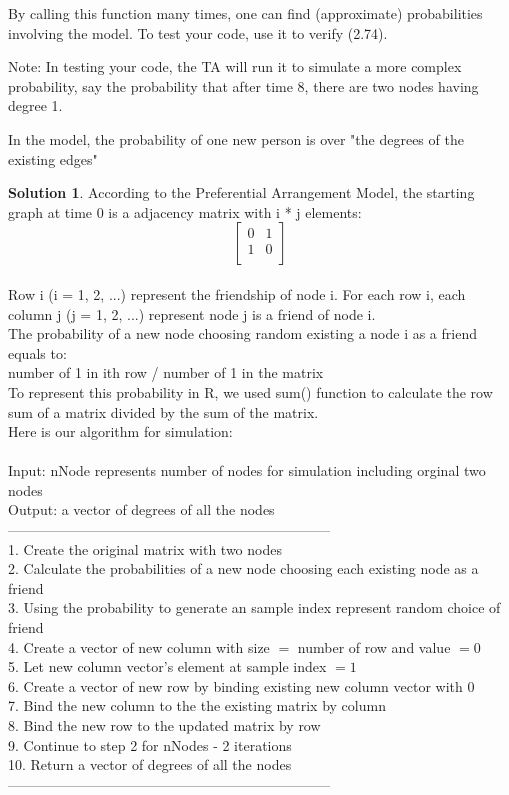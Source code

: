 \documentclass[paper=a4, fontsize=11pt]{scrartcl} %
\numberwithin{equation}{section} %
\numberwithin{figure}{section} %
\numberwithin{table}{section} %
\theoremstyle{definition}
\newtheorem*{solution}{Solution}
\begin{document}
By calling this function many times, one can find (approximate) probabilities involving the model. To test your code, use it to verify (2.74).

Note: In testing your code, the TA will run it to simulate a more complex probability, say the probability that after time 8, there are two nodes having degree 1.

In the model, the probability of one new person is over "the degrees of the existing edges"
    \begin{solution}
    According to the Preferential Arrangement Model, the starting graph at time 0 is a adjacency matrix with i * j elements:\\
    \[\begin{bmatrix}
    0&1\\
    1&0\\
    \end{bmatrix}\]\\
    Row i (i = 1, 2, ...) represent the friendship of node i. For each row i, each column j (j = 1, 2, ...) represent node j is a friend of node i.\\
    The probability of a new node choosing random existing a node i as a friend equals to:\\
    number of 1 in ith row / number of 1 in the matrix\\
    To represent this probability in R, we used sum() function to calculate the row sum of a matrix divided by the sum of the matrix.\\
    Here is our algorithm for simulation:\\\\
    Input: nNode represents number of nodes for simulation including orginal two nodes\\
    Output: a vector of degrees of all the nodes\\
    ---------------------------------------------------------------------\\
    1. Create the original matrix with two nodes\\
    2. Calculate the probabilities of a new node choosing each existing node as a friend\\
    3. Using the probability to generate an sample index represent random choice of friend\\
    4. Create a vector of new column with size $=$ number of row and value $= 0$\\
    5. Let new column vector's element at sample index $= 1$\\
    6. Create a vector of new row by binding existing new column vector with $0$\\
    7. Bind the new column to the the existing matrix by column\\
    8. Bind the new row to the updated matrix by row\\
    9. Continue to step 2 for nNodes - 2 iterations\\
    10. Return a vector of degrees of all the nodes\\
    ---------------------------------------------------------------------\\
    \end{solution}
\end{document}
